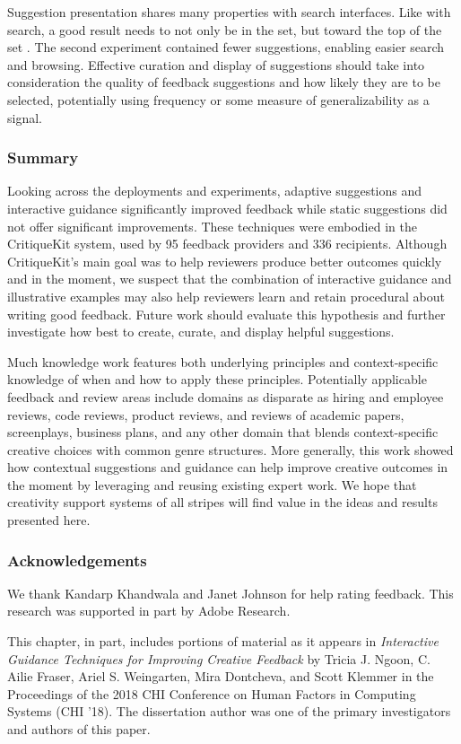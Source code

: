 Suggestion presentation shares many properties with search interfaces. Like with search, a good result needs to not only be in the set, but toward the top of the set \cite{hearst2009search}. The second experiment contained fewer suggestions, enabling easier search and browsing. Effective curation and display of suggestions should take into consideration the quality of feedback suggestions and how likely they are to be selected, potentially using frequency or some measure of generalizability as a signal. 

\subsubsection{Summary}
Looking across the deployments and experiments, adaptive suggestions and interactive guidance significantly improved feedback while static suggestions did not offer significant improvements. These techniques were embodied in the CritiqueKit system, used by 95 feedback providers and 336 recipients. Although CritiqueKit's main goal was to help reviewers produce better outcomes quickly and in the moment, we suspect that the combination of interactive guidance and illustrative examples may also help reviewers learn and retain procedural about writing good feedback. Future work should evaluate this hypothesis and further investigate how best to create, curate, and display helpful suggestions. 

Much knowledge work features both underlying principles and context-specific knowledge of when and how to apply these principles. Potentially applicable feedback and review areas include domains as disparate as hiring and employee reviews, code reviews, product reviews, and reviews of academic papers, screenplays, business plans, and any other domain that blends context-specific creative choices with common genre structures. More generally, this work showed how contextual suggestions and guidance can help improve creative outcomes in the moment by leveraging and reusing existing expert work. We hope that creativity support systems of all stripes will find value in the ideas and results presented here.

\subsubsection{Acknowledgements}
We thank Kandarp Khandwala and Janet Johnson for help rating feedback. This research was supported in part by Adobe Research.

This chapter, in part, includes portions of material as it appears in \textit{Interactive Guidance Techniques for Improving Creative Feedback} by Tricia J. Ngoon, C. Ailie Fraser, Ariel S. Weingarten, Mira Dontcheva, and Scott Klemmer in the Proceedings of the 2018 CHI Conference on Human Factors in Computing Systems (CHI '18). The dissertation author was one of the primary investigators and authors of this paper.
